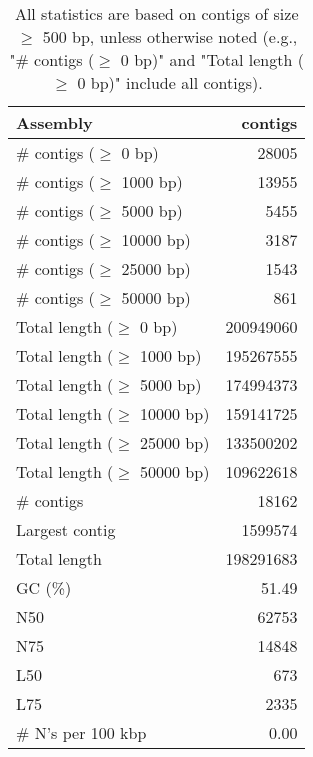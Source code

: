 \documentclass[12pt,a4paper]{article}
\begin{document}
\begin{table}[ht]
\begin{center}
\caption{All statistics are based on contigs of size $\geq$ 500 bp, unless otherwise noted (e.g., "\# contigs ($\geq$ 0 bp)" and "Total length ($\geq$ 0 bp)" include all contigs).}
\begin{tabular}{|l*{1}{|r}|}
\hline
Assembly & contigs \\ \hline
\# contigs ($\geq$ 0 bp) & 28005 \\ \hline
\# contigs ($\geq$ 1000 bp) & 13955 \\ \hline
\# contigs ($\geq$ 5000 bp) & 5455 \\ \hline
\# contigs ($\geq$ 10000 bp) & 3187 \\ \hline
\# contigs ($\geq$ 25000 bp) & 1543 \\ \hline
\# contigs ($\geq$ 50000 bp) & 861 \\ \hline
Total length ($\geq$ 0 bp) & 200949060 \\ \hline
Total length ($\geq$ 1000 bp) & 195267555 \\ \hline
Total length ($\geq$ 5000 bp) & 174994373 \\ \hline
Total length ($\geq$ 10000 bp) & 159141725 \\ \hline
Total length ($\geq$ 25000 bp) & 133500202 \\ \hline
Total length ($\geq$ 50000 bp) & 109622618 \\ \hline
\# contigs & 18162 \\ \hline
Largest contig & 1599574 \\ \hline
Total length & 198291683 \\ \hline
GC (\%) & 51.49 \\ \hline
N50 & 62753 \\ \hline
N75 & 14848 \\ \hline
L50 & 673 \\ \hline
L75 & 2335 \\ \hline
\# N's per 100 kbp & 0.00 \\ \hline
\end{tabular}
\end{center}
\end{table}
\end{document}
